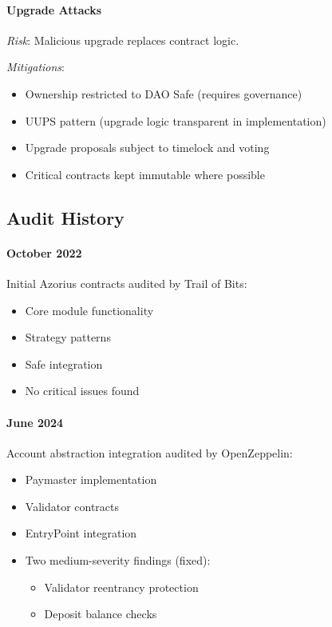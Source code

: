 \paragraph{Upgrade Attacks}

\textit{Risk}: Malicious upgrade replaces contract logic.

\textit{Mitigations}:
\begin{itemize}
    \item Ownership restricted to DAO Safe (requires governance)
    \item UUPS pattern (upgrade logic transparent in implementation)
    \item Upgrade proposals subject to timelock and voting
    \item Critical contracts kept immutable where possible
\end{itemize}

\subsection{Audit History}

\paragraph{October 2022} Initial Azorius contracts audited by Trail of Bits:
\begin{itemize}
    \item Core module functionality
    \item Strategy patterns
    \item Safe integration
    \item No critical issues found
\end{itemize}

\paragraph{June 2024} Account abstraction integration audited by OpenZeppelin:
\begin{itemize}
    \item Paymaster implementation
    \item Validator contracts
    \item EntryPoint integration
    \item Two medium-severity findings (fixed):
    \begin{itemize}
        \item Validator reentrancy protection
        \item Deposit balance checks
    \end{itemize}
\end{itemize}


